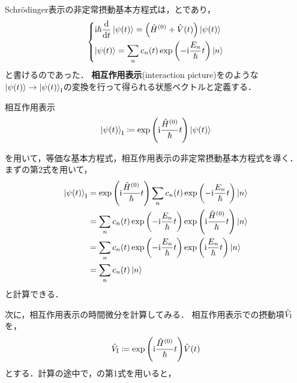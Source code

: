 \documentclass{report}
\begin{document}
  Schr\"odinger表示の非定常摂動基本方程式は，とであり，
  \begin{align}
    \begin{dcases}
      \mathrm{i}\hbar\dv{t}\ket{\psi(t)} = \qty(\hat{H}^{(0)} + \hat{V}(t))\ket{\psi(t)} \label{TDSE} \\
      \ket{\psi(t)} = \sum_{n}c_n(t)\exp\qty(-\mathrm{i}\frac{E_n}{\hbar}t)\ket{n}
    \end{dcases}
  \end{align}
  と書けるのであった．
  \textbf{相互作用表示}(interaction picture)をのような$\ket{\psi(t)} \to \ket{\psi(t)}_{\mathrm{I}}$の変換を行って得られる状態ベクトルと定義する．
  \begin{itembox}[l]{相互作用表示}
    \begin{align}
      \ket{\psi(t)}_{\mathrm{I}} \coloneqq \exp\qty(\mathrm{i}\frac{\hat{H}^{(0)}}{\hbar}t)\ket{\psi(t)}\label{interaction-picture}
    \end{align}
  \end{itembox}
  を用いて，等価な基本方程式，相互作用表示の非定常摂動基本方程式を導く．
  まずの第2式を用いて，
  \begin{align}
    \ket{\psi(t)}_{\mathrm{I}} &= \exp\qty(\mathrm{i}\frac{\hat{H}^{(0)}}{\hbar}t)\sum_{n}c_n(t)\exp\qty(-\mathrm{i}\frac{E_n}{\hbar}t)\ket{n}\\
    &= \sum_{n}c_n(t)\exp\qty(-\mathrm{i}\frac{E_n}{\hbar}t)\exp\qty(\mathrm{i}\frac{\hat{H}^{(0)}}{\hbar}t)\ket{n} \\ 
    &= \sum_{n}c_n(t)\exp\qty(-\mathrm{i}\frac{E_n}{\hbar}t)\exp\qty(\mathrm{i}\frac{E_n}{\hbar}t)\ket{n} \\ 
    &= \sum_{n}c_n(t)\ket{n}\label{TDSE-2nd-eq-interaction-picture}
  \end{align}
  と計算できる．
  \par
  次に，相互作用表示の時間微分を計算してみる．
  相互作用表示での摂動項$\hat{V}_{\mathrm{I}}$を，
  \begin{align}
    \hat{V}_{\mathrm{I}} \coloneqq \exp\qty(\mathrm{i}\frac{\hat{H}^{(0)}}{\hbar}t)\hat{V}(t)
  \end{align}
  とする．計算の途中で，の第1式を用いると，
\end{document}
